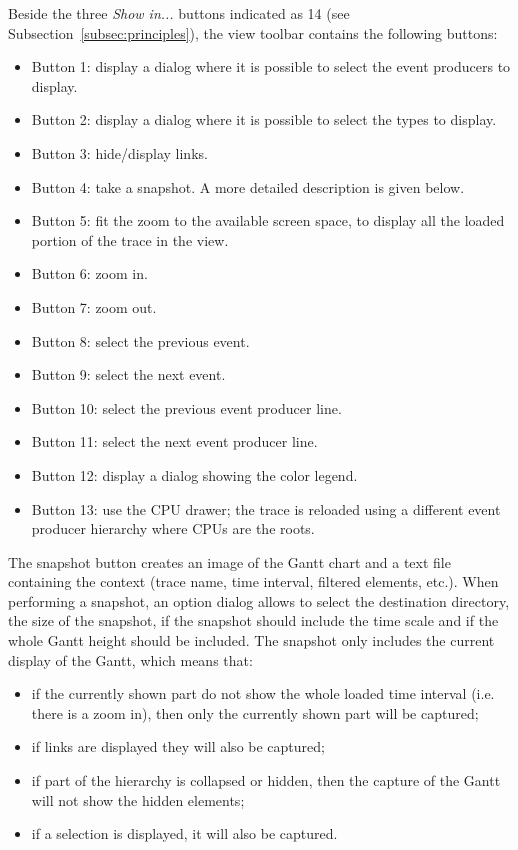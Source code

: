\documentclass[twoside]{article}
\begin{document}
\begin{sloppypar}
Beside the three \emph{Show in...} buttons indicated as \num{14} (see Subsection~\ref{subsec:principles}), the view toolbar contains the following buttons:
\begin{itemize}
	\item Button \num{1}: display a dialog where it is possible to select the event producers to display.
	\item Button \num{2}: display a dialog where it is possible to select the types to display.
	\item Button \num{3}: hide/display links.
	\item Button \num{4}: take a snapshot. A more detailed description is given below. 
	\item Button \num{5}: fit the zoom to the available screen space, to display all the loaded portion of the trace in the view.
    \item Button \num{6}: zoom in.
	\item Button \num{7}: zoom out.
  	\item Button \num{8}: select the previous event.
	\item Button \num{9}: select the next event.
	\item Button \num{10}: select the previous event producer line.
	\item Button \num{11}: select the next event producer line.
    \item Button \num{12}: display a dialog showing the color legend. 
	\item Button \num{13}: use the CPU drawer; the trace is reloaded using a different event producer hierarchy where CPUs are the roots.
\end{itemize}

The snapshot button creates an image of the Gantt chart and a text file containing the context (trace name, time interval, filtered elements, etc.).
When performing a snapshot, an option dialog allows to select the destination directory, the size of the snapshot, if the snapshot should include the time scale and if the whole Gantt height should be included.
The snapshot only includes the current display of the Gantt, which means that:
\begin{itemize}
	\item if the currently shown part do not show the whole loaded time interval (i.e. there is a zoom in), then only the currently shown part will be captured;
	\item if links are displayed they will also be captured;
	\item if part of the hierarchy is collapsed or hidden, then the capture of the Gantt will not show the hidden elements;
	\item if a selection is displayed, it will also be captured.
\end{itemize}


\end{sloppypar}
\end{document}
